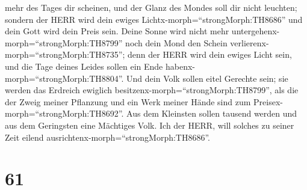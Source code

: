 mehr des Tages dir scheinen, und der Glanz des Mondes soll dir nicht
leuchten; sondern der HERR wird dein ewiges
Lichtx-morph=``strongMorph:TH8686'' und dein Gott wird dein Preis sein.
 Deine Sonne wird nicht mehr
untergehenx-morph=``strongMorph:TH8799'' noch dein Mond den Schein
verlierenx-morph=``strongMorph:TH8735''; denn der HERR wird dein ewiges
Licht sein, und die Tage deines Leides sollen ein Ende
habenx-morph=``strongMorph:TH8804''.  Und dein Volk sollen
eitel Gerechte sein; sie werden das Erdreich ewiglich
besitzenx-morph=``strongMorph:TH8799'', als die der Zweig meiner
Pflanzung und ein Werk meiner Hände sind zum
Preisex-morph=``strongMorph:TH8692''.  Aus dem Kleinsten
sollen tausend werden und aus dem Geringsten eine Mächtiges Volk. Ich
der HERR, will solches zu seiner Zeit eilend
ausrichtenx-morph=``strongMorph:TH8686''.

\hypertarget{section-60}{%
\section{61}\label{section-60}}

